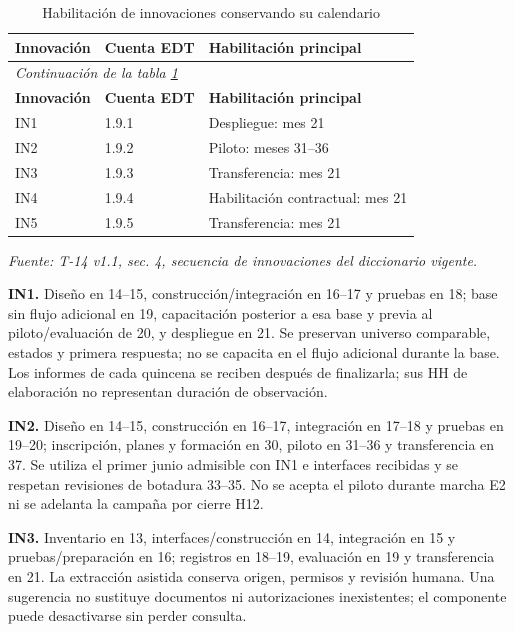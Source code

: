 \begingroup\small\setlength{\tabcolsep}{3pt}
\begin{longtable}{p{}p{}p{}}
\caption{Habilitación de innovaciones conservando su calendario}\label{tab:t18-innovaciones}\\\hline
\textbf{Innovación} & \textbf{Cuenta EDT} & \textbf{Habilitación principal}\\\hline\endfirsthead
\multicolumn{3}{l}{\textit{Continuación de la tabla \ref{tab:t18-innovaciones}}}\\\hline
\textbf{Innovación} & \textbf{Cuenta EDT} & \textbf{Habilitación principal}\\\hline\endhead
\hline\endfoot\hline\endlastfoot
IN1 & 1.9.1 & Despliegue: mes 21\\\hline
IN2 & 1.9.2 & Piloto: meses 31--36\\\hline
IN3 & 1.9.3 & Transferencia: mes 21\\\hline
IN4 & 1.9.4 & Habilitación contractual: mes 21\\\hline
IN5 & 1.9.5 & Transferencia: mes 21\\\hline
\end{longtable}\endgroup
\noindent\textit{Fuente: T-14 v1.1, sec. 4, secuencia de innovaciones del diccionario vigente.}

\textbf{IN1.} Diseño en 14--15, construcción/integración en 16--17 y pruebas en 18; base sin flujo adicional en 19, capacitación posterior a esa base y previa al piloto/evaluación de 20, y despliegue en 21. Se preservan universo comparable, estados y primera respuesta; no se capacita en el flujo adicional durante la base. Los informes de cada quincena se reciben después de finalizarla; sus HH de elaboración no representan duración de observación.

\textbf{IN2.} Diseño en 14--15, construcción en 16--17, integración en 17--18 y pruebas en 19--20; inscripción, planes y formación en 30, piloto en 31--36 y transferencia en 37. Se utiliza el primer junio admisible con IN1 e interfaces recibidas y se respetan revisiones de botadura 33--35. No se acepta el piloto durante marcha E2 ni se adelanta la campaña por cierre H12.

\textbf{IN3.} Inventario en 13, interfaces/construcción en 14, integración en 15 y pruebas/preparación en 16; registros en 18--19, evaluación en 19 y transferencia en 21. La extracción asistida conserva origen, permisos y revisión humana. Una sugerencia no sustituye documentos ni autorizaciones inexistentes; el componente puede desactivarse sin perder consulta.

